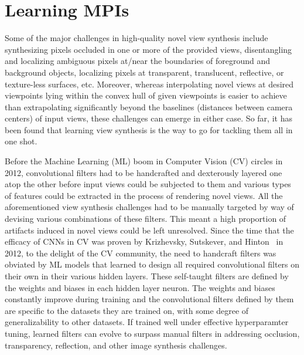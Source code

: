\section{Learning MPIs}\label{sec:learning-mpis} 

Some of the major challenges in high-quality novel view synthesis include synthesizing pixels occluded in one or more of the provided views, disentangling and localizing ambiguous pixels at/near the boundaries of foreground and background objects, localizing pixels at transparent, translucent, reflective, or texture-less surfaces, etc. Moreover, whereas interpolating novel views at desired viewpoints lying within the convex hull of given viewpoints is easier to achieve than extrapolating significantly beyond the baselines (distances between camera centers) of input views, these challenges can emerge in either case. So far, it has been found that learning view synthesis is the way to go for tackling them all in one shot.

Before the Machine Learning (ML) boom in Computer Vision (CV) circles in 2012, convolutional filters had to be handcrafted and dexterously layered one atop the other before input views could be subjected to them and various types of features could be extracted in the process of rendering novel views. All the aforementioned view synthesis challenges had to be manually targeted by way of devising various combinations of these filters. This meant a high proportion of artifacts induced in novel views could be left unresolved. Since the time that the efficacy of CNNs in CV was proven by Krizhevsky, Sutskever, and Hinton~\cite{krizhevsky_imagenet_2012} in 2012, to the delight of the CV community, the need to handcraft filters was obviated by ML models that learned to design all required convolutional filters on their own in their various hidden layers. These self-taught filters are defined by the weights and biases in each hidden layer neuron. The weights and biases constantly improve during training and the convolutional filters defined by them are specific to the datasets they are trained on, with some degree of generalizability to other datasets. If trained well under effective hyperparamter tuning, learned filters can evolve to surpass manual filters in addressing occlusion, transparency, reflection, and other image synthesis challenges.

